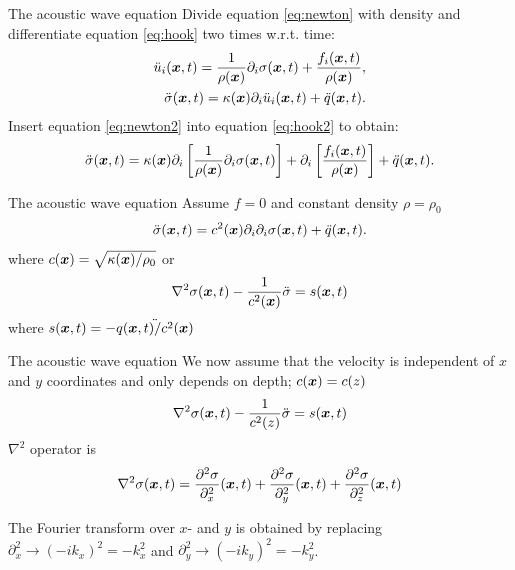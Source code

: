 \documentclass[xcolor=dvipsnames,notes]{beamer}
\begin{document}
\begin{frame}{The acoustic wave equation}
Divide equation \eqref{eq:newton} with density and
differentiate equation \eqref{eq:hook} two times  w.r.t. time:
\begin{eqnarray}
\ddot{u}_i(\mbox{\boldmath $x$},t) = \frac{1}{\rho(\mbox{\boldmath $x$})}\partial_i \sigma(\mbox{\boldmath $x$},t) + \frac{f_i(\mbox{\boldmath $x$},t)}{\rho(\mbox{\boldmath $x$})},\label{eq:newton2}\\
\ddot{\sigma}(\mbox{\boldmath $x$},t) = \kappa(\mbox{\boldmath $x$}) \partial_i \ddot{u}_i(\mbox{\boldmath $x$},t) + \ddot{q}(\mbox{\boldmath $x$},t).
                                                     \label{eq:hook2} 
\end{eqnarray}
Insert equation \eqref{eq:newton2} into equation \eqref{eq:hook2} to obtain:
\begin{eqnarray}
\ddot{\sigma}(\mbox{\boldmath $x$},t) = \kappa(\mbox{\boldmath $x$}) \partial_i \left[ \frac{1}{\rho(\mbox{\boldmath $x$})}\partial_i \sigma(\mbox{\boldmath $x$},t)\right]
                                       +\partial_i \left[ \frac{f_i(\mbox{\boldmath $x$},t)}{\rho(\mbox{\boldmath $x$})}\right] + \ddot{q}(\mbox{\boldmath $x$},t).
                                                     \label{eq:wave1}
\end{eqnarray}
\end{frame}
\begin{frame}{The acoustic wave equation}
Assume $f=0$ and constant density $\rho=\rho_0$
\begin{eqnarray}
\ddot{\sigma}(\mbox{\boldmath $x$},t) = c^2(\mbox{\boldmath $x$})\partial_i \partial_i  \sigma(\mbox{\boldmath $x$},t)
                                        + \ddot{q}(\mbox{\boldmath $x$},t).
                                                     \label{eq:wave2}
\end{eqnarray}
where $c(\mbox{\boldmath $x$})=\sqrt{\kappa(\mbox{\boldmath $x$})/\rho_0}$
or
\begin{eqnarray}
\nabla^2 \sigma(\mbox{\boldmath $x$},t)-\frac{1}{c^2(\mbox{\boldmath $x$})} \ddot{\sigma} = s(\mbox{\boldmath $x$},t)
                                                     \label{eq:wave}
\end{eqnarray}
where $s(\mbox{\boldmath $x$},t) = -\ddot{q(\mbox{\boldmath $x$},t)/c^2(\mbox{\boldmath $x$})}$
\end{frame}
\begin{frame}{The acoustic wave equation}
We now assume that the velocity is independent of $x$ and $y$ coordinates
and only depends on depth; $c(\mbox{\boldmath $x$})=c(z)$
\begin{eqnarray}
\nabla^2 \sigma(\mbox{\boldmath $x$},t)-\frac{1}{c^2(z)} \ddot{\sigma} = s(\mbox{\boldmath $x$},t)
\end{eqnarray}
$\nabla ^2$ operator is
\begin{eqnarray}
\nabla^2 \sigma(\mbox{\boldmath $x$},t) = \frac{\partial^2 \sigma}{\partial^2_x}(\mbox{\boldmath $x$},t) 
                        +\frac{\partial^2 \sigma}{\partial^2_y}(\mbox{\boldmath $x$},t) 
                        +\frac{\partial^2 \sigma}{\partial^2_z}(\mbox{\boldmath $x$},t)
\end{eqnarray}

The Fourier transform over $x$- and $y$ is obtained by replacing $\partial^2_x \rightarrow (-ik_x)^2 =-k^2_x$ and
$\partial^2_y \rightarrow (-ik_y)^2 =-k^2_y$.
\end{frame}
\end{document}

